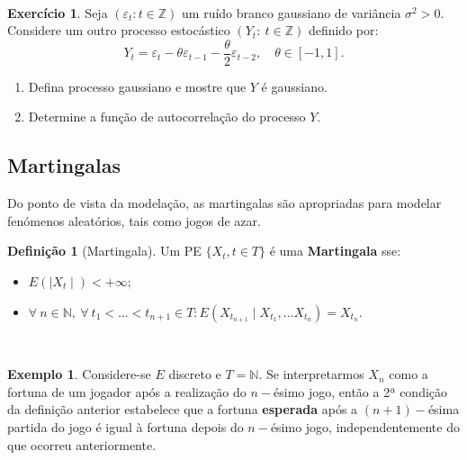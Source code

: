 \documentclass[
  11pt,
  a4paper,
]{book}
\theoremstyle{definition}
\newtheorem{definition}{Definição}[chapter]
\theoremstyle{definition}
\newtheorem{example}{Exemplo}[chapter]
\theoremstyle{definition}
\newtheorem{exercise}{Exercício}[chapter]
\theoremstyle{definition}
\theoremstyle{remark}
\begin{document}
\(\,\)

\begin{exercise}

Seja \((\varepsilon_t: t \in \mathbb{Z})\) um ruído branco gaussiano de variância \(\sigma^2>0\). Considere um outro processo estocástico \((Y_t: ~t \in \mathbb{Z})\) definido por:
\[Y_t=\varepsilon_t -\theta \varepsilon_{t-1}-\dfrac{\theta}{2}\varepsilon_{t-2}, \quad \theta \in [-1,1].\]

\begin{enumerate}
\def\labelenumi{(\alph{enumi})}
\item
  Defina processo gaussiano e mostre que \(Y\) é gaussiano.
\item
  Determine a função de autocorrelação do processo \(Y\).
\end{enumerate}

\end{exercise}

\subsection{Martingalas}\label{martingalas}

Do ponto de vista da modelação, as martingalas são apropriadas para modelar fenómenos aleatórios, tais como jogos de azar.

\begin{definition}[Martingala]

Um PE \(\{X_t, t \in T\}\) é uma \textbf{Martingala} sse:

\begin{itemize}
\item
  \(E(\mid X_t \mid) < +\infty;\)
\item
  \(\forall ~n \in \mathbb{N}, ~\forall ~t_1< \ldots < t_{n+1} \in T: E(X_{t_{n+1}} \mid X_{t_1}, \ldots X_{t_n})=X_{t_n}\).
\end{itemize}

\end{definition}

\(\,\)

\begin{example}
Considere-se \(E\) discreto e \(T=\mathbb{N}\). Se interpretarmos \(X_n\) como a fortuna de um jogador após a realização do \(n-\)ésimo jogo, então a 2ª condição da definição anterior estabelece que a fortuna \textbf{esperada} após a \((n+1)-\)ésima partida do jogo é igual à fortuna depois do \(n-\)ésimo jogo, independentemente do que ocorreu anteriormente.
\end{example}
\end{document}
